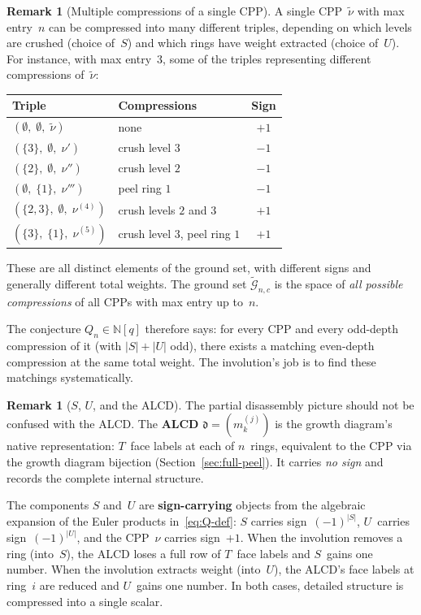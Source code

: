 \documentclass[11pt]{article}
\newcommand{\N}{\mathbb{N}}
\theoremstyle{plain}
\theoremstyle{definition}
\newtheorem{remark}[theorem]{Remark}
\begin{document}
\begin{remark}[Multiple compressions of a single CPP]
\label{rmk:multiple-compressions}
A single CPP~$\tilde{\nu}$ with max entry~$n$ can be compressed
into many different triples, depending on which levels are crushed
(choice of~$S$) and which rings have weight extracted
(choice of~$U$).  For instance, with max entry~$3$, some of the
triples representing different compressions of~$\tilde{\nu}$:
\begin{center}
\renewcommand{\arraystretch}{1.3}
\begin{tabular}{l|l|c}
\textbf{Triple} & \textbf{Compressions} & \textbf{Sign}
\\ \hline
$(\emptyset,\; \emptyset,\; \tilde{\nu})$
  & none & $+1$ \\
$(\{3\},\; \emptyset,\; \nu')$
  & crush level $3$ & $-1$ \\
$(\{2\},\; \emptyset,\; \nu'')$
  & crush level $2$ & $-1$ \\
$(\emptyset,\; \{1\},\; \nu''')$
  & peel ring $1$ & $-1$ \\
$(\{2,3\},\; \emptyset,\; \nu^{(4)})$
  & crush levels $2$ and $3$ & $+1$ \\
$(\{3\},\; \{1\},\; \nu^{(5)})$
  & crush level $3$, peel ring $1$ & $+1$
\end{tabular}
\end{center}
These are all distinct elements of the ground set, with different
signs and generally different total weights.  The ground set
$\widetilde{\mathcal{G}}_{n,c}$ is the space of \emph{all possible
compressions} of all CPPs with max entry up to~$n$.

The conjecture $Q_n \in \N[q]$ therefore says: for every CPP and
every odd-depth compression of it (with $|S| + |U|$ odd), there
exists a matching even-depth compression at the same total weight.
The involution's job is to find these matchings systematically.
\end{remark}

\begin{remark}[$S$, $U$, and the ALCD]
\label{rmk:S-U-ALCD}
The partial disassembly picture should not be confused with the
ALCD\@.  The \textbf{ALCD} $\mathfrak{d} = (m_k^{(j)})$ is the
growth diagram's native representation: $T$~face labels at each of
$n$~rings, equivalent to the CPP via the growth diagram bijection
(Section~\ref{sec:full-peel}).  It carries \emph{no sign} and
records the complete internal structure.

The components $S$ and~$U$ are \textbf{sign-carrying} objects from
the algebraic expansion of the Euler products
in~\eqref{eq:Q-def}: $S$ carries sign~$(-1)^{|S|}$, $U$~carries
sign~$(-1)^{|U|}$, and the CPP~$\nu$ carries sign~$+1$.  When the
involution removes a ring (into~$S$), the ALCD loses a full row of
$T$~face labels and $S$~gains one number.  When the involution
extracts weight (into~$U$), the ALCD's face labels at ring~$i$
are reduced and $U$~gains one number.  In both cases, detailed
structure is compressed into a single scalar.
\end{remark}
\end{document}
